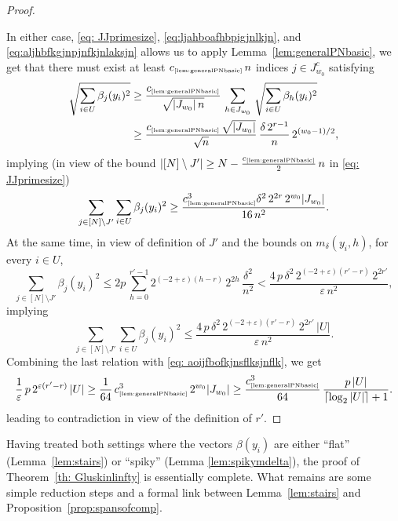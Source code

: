 \documentclass[11pt]{amsart}
\theoremstyle{definition}
\theoremstyle{plain}
\begin{document}
\begin{proof}
\begin{itemize}
\end{itemize}

In either case, 
\eqref{eq: JJprimesize},
\eqref{eq:ljahboafhbpigjnlkjn}, and
\eqref{eq:aljhbfkgjnpjnfkjnlaksjn}
allows us to apply
Lemma~\ref{lem:generalPNbasic},
    we get that there must exist 
    at least $c_{\text{\tiny\ref{lem:generalPNbasic}}}\,n$
    indices $j\in J^c_{w_0}$ satisfying
    \begin{align*}
    \sqrt{\sum_{i\in U}\beta_j(y_i)^2}
    &\geq 
    \frac{c_{\text{\tiny\ref{lem:generalPNbasic}}}}{\sqrt{|J_{w_0}|\,n}}\,
    \sum_{h\in J_{w_0}}
    \,\sqrt{\sum_{i\in U}\beta_h(y_i)^2}\\
    &\geq 
    \frac{c_{\text{\tiny\ref{lem:generalPNbasic}}}\,
    \sqrt{|J_{w_0}|}}{\sqrt{n}}\,
    \frac{\delta\,2^{r-1}}{n}\,
    2^{(w_0-1)/2},
    \end{align*}
    implying (in view of the bound $|[N]\setminus J'|
    \geq N-\frac{c_{\text{\tiny\ref{lem:generalPNbasic}}}}{2}\,n$
    in \eqref{eq: JJprimesize})
    \begin{equation}\label{eq: aoijfbofkjnsflksjnflk}
    \sum_{j\in[N]\setminus J'}\sum_{i\in U}\beta_j(y_i)^2
    \geq 
    \frac{c_{\text{\tiny\ref{lem:generalPNbasic}}}^3
    \delta^2\,2^{2r}\,2^{w_0}|J_{w_0}|}{16\,n^2}.
    \end{equation}
   At the same time, in view of definition of $J'$
   and the bounds on $m_\delta(y_i,h)$,
   for every $i\in U$,
   $$
   \sum_{j\in[N]\setminus J'}
   \beta_j(y_i)^2
   \leq 2p\,\sum\limits_{h=0}^{r'-1}
    2^{(-2+\varepsilon)(h-r)}\,2^{2h}\,\frac{\delta^2}{n^2}
    <
    \frac{4\,p\,\delta^2\,2^{(-2+\varepsilon)(r'-r)}\,2^{2r'}}{\varepsilon\,n^2},
   $$
implying
$$
\sum_{j\in[N]\setminus J'}
\sum_{i\in U}
   \beta_j(y_i)^2
\leq \frac{4\,p\,\delta^2\,2^{(-2+\varepsilon)(r'-r)}\,2^{2r'}\,|U|}{\varepsilon\,n^2}.
$$
Combining the last relation with \eqref{eq: aoijfbofkjnsflksjnflk},
we get
$$
\frac{1}{\varepsilon}
\,p\,2^{\varepsilon(r'-r)}\,|U|
\geq 
\frac{1}{64}\,c_{\text{\tiny\ref{lem:generalPNbasic}}}^3
\,2^{w_0}|J_{w_0}|
\geq 
\frac{c_{\text{\tiny\ref{lem:generalPNbasic}}}^3}{64}\,
\frac{p\,|U|}{\lceil\log_2|U|\rceil+1}.
$$
leading to contradiction in view of the definition of $r'$.
\end{proof}

Having treated both settings where the vectors $\beta(y_i)$ are either ``flat''
(Lemma~\ref{lem:stairs}) or ``spiky'' (Lemma \ref{lem:spikymdelta}), the proof of Theorem~\ref{th: Gluskinlinfty}
is essentially complete. What remains are some simple reduction steps
and a formal link between Lemma~\ref{lem:stairs} and Proposition~\ref{prop:spansofcomp}.
\end{document}
